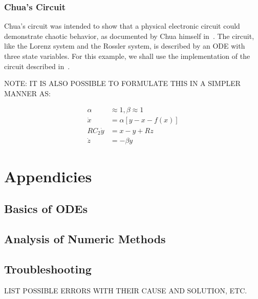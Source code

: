 \documentclass[letterpaper,10pt]{book}
\begin{document}
      
    \section{Chua's Circuit}
      Chua's circuit was intended to show that a physical electronic circuit could demonstrate chaotic behavior, as documented by Chua himself in~\cite{chua1992genesis}.  The circuit, like the Lorenz system and the Rossler system, is described by an ODE with three state variables.  For this example, we shall use the implementation of the circuit described in~\cite{kennedy1992robust}.

      NOTE: IT IS ALSO POSSIBLE TO FORMULATE THIS IN A SIMPLER MANNER AS:
      
      \begin{equation}
	\begin{aligned}	  
	  \alpha{} &\approx{} 1, \beta{} \approx{} 1\\
	  \dot{x} &= \alpha{}[y - x - f(x)]\\
	  RC_{2}\dot{y} &= x - y + Rz\\
	  \dot{z} &= -\beta{}y
	\end{aligned}
      \end{equation}
      
\part{Appendicies}
  \chapter{Basics of ODEs}
  
  \chapter{Analysis of Numeric Methods}
  
  \chapter{Troubleshooting}
    LIST POSSIBLE ERRORS WITH THEIR CAUSE AND SOLUTION, ETC.
    


  
\printindex
\end{document}
